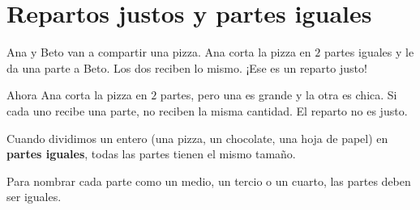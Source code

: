 
\section{Repartos justos y partes iguales}

Ana y Beto van a compartir una pizza. Ana corta la pizza en $2$ partes iguales y le da una parte a Beto. Los dos reciben lo mismo. ¡Ese es un reparto justo!

\begin{center}
\end{center}

Ahora Ana corta la pizza en $2$ partes, pero una es grande y la otra es chica. Si cada uno recibe una parte, no reciben la misma cantidad. El reparto no es justo.

\begin{wbidea}
Cuando dividimos un entero (una pizza, un chocolate, una hoja de papel) en \textbf{partes iguales}, todas las partes tienen el mismo tamaño.

Para nombrar cada parte como un medio, un tercio o un cuarto, las partes deben ser iguales.
\end{wbidea}

